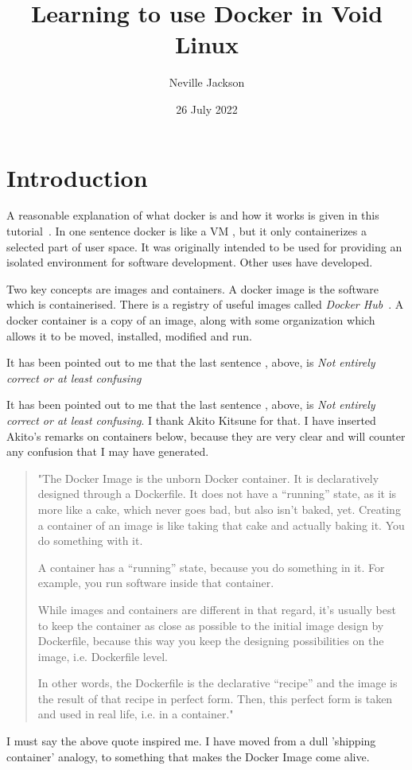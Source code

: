 \documentclass{article}  %
\title{Learning to use Docker in Void Linux}
\author{Neville Jackson}
\date{26 July 2022}
\begin{document}
 

\maketitle      

\section{Introduction} 
A reasonable explanation of what docker is and how it works is given in this tutorial~\cite{dock:00}. In one sentence docker is like a VM , but it only containerizes a selected part of user space. It was originally intended to be used for providing an isolated environment for software development. Other uses have developed. 

Two key concepts are images and containers. A docker image is the software which is containerised. There is a registry of useful images called {\em Docker Hub}~\cite{dock:02}. A docker container is  a copy of an image, along with some organization which  allows it to be moved, installed, modified and run.

It has been pointed out to me that the last sentence , above, is {\em Not entirely correct or at least confusing}

It has been pointed out to me that the last sentence , above, is {\em Not entirely correct or at least confusing}. I thank Akito Kitsune for that. I have inserted Akito's remarks on containers below, because they are very clear and will counter any confusion that I may have generated.
\begin{quote}
"The Docker Image is the unborn Docker container. It is declaratively designed through a Dockerfile.
It does not have a “running” state, as it is more like a cake, which never goes bad, but also isn’t baked, yet.
Creating a container of an image is like taking that cake and actually baking it. You do something with it.

A container has a “running” state, because you do something in it. For example, you run software inside that container.

While images and containers are different in that regard, it’s usually best to keep the container as close as possible to the initial image design by Dockerfile, because this way you keep the designing possibilities on the image, i.e. Dockerfile level.

In other words, the Dockerfile is the declarative “recipe” and the image is the result of that recipe in perfect form.
Then, this perfect form is taken and used in real life, i.e. in a container."
\end{quote}
I must say the above quote inspired me. I have moved from a dull 'shipping container' analogy, to something that makes the Docker Image come alive.
\end{document}
